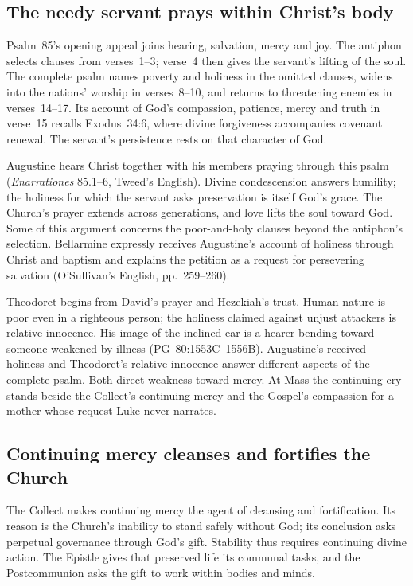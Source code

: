 \subsection*{The needy servant prays within Christ's body\enspace{}}

Psalm~85's opening appeal joins hearing, salvation, mercy and joy. The
antiphon selects clauses from verses~1--3; verse~4 then gives the servant's
lifting of the soul. The complete psalm names poverty and holiness in the
omitted clauses, widens into the nations' worship in verses~8--10, and
returns to threatening enemies in verses~14--17. Its account of God's
compassion, patience, mercy and truth in verse~15 recalls Exodus~34:6,
where divine forgiveness accompanies covenant renewal. The servant's
persistence rests on that character of God.

Augustine hears Christ together with his members praying through this
psalm (\emph{Enarrationes} 85.1--6, Tweed's English). Divine condescension
answers humility; the holiness for which the servant asks preservation is
itself God's grace. The Church's prayer extends across generations, and
love lifts the soul toward God. Some of this argument concerns the
poor-and-holy clauses beyond the antiphon's selection. Bellarmine expressly
receives Augustine's account of holiness through Christ and baptism and
explains the petition as a request for persevering salvation
(O'Sullivan's English, pp.~259--260).

Theodoret begins from David's prayer and Hezekiah's trust. Human nature is
poor even in a righteous person; the holiness claimed against unjust
attackers is relative innocence. His image of the inclined ear is a hearer
bending toward someone weakened by illness (PG~80:1553C--1556B).
Augustine's received holiness and Theodoret's relative innocence answer
different aspects of the complete psalm. Both direct weakness toward mercy.
At Mass the continuing cry stands beside the Collect's continuing mercy and
the Gospel's compassion for a mother whose request Luke never narrates.

\subsection*{Continuing mercy cleanses and fortifies the Church\enspace{}}

The Collect makes continuing mercy the agent of cleansing and fortification.
Its reason is the Church's inability to stand safely without God; its
conclusion asks perpetual governance through God's gift. Stability thus
requires continuing divine action. The Epistle gives that preserved life
its communal tasks, and the Postcommunion asks the gift to work within
bodies and minds.

